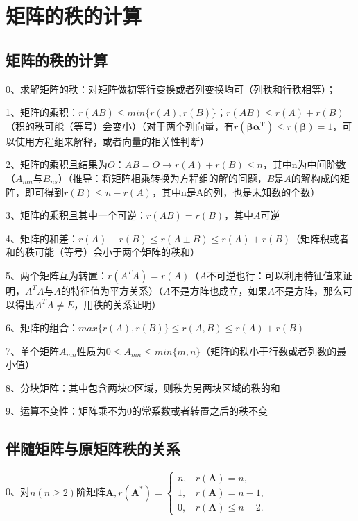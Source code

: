 \section{矩阵的秩的计算}



\subsection{矩阵的秩的计算}

0、求解矩阵的秩：对矩阵做初等行变换或者列变换均可（列秩和行秩相等）；

1、矩阵的乘积：$r(AB) \leqslant min\{r(A),r(B)\}$；$r(AB) \leqslant r(A)+r(B)$（积的秩可能（等号）会变小）（对于两个列向量，有$r\left(\boldsymbol{\beta} \boldsymbol{\alpha}^{\mathrm{T}}\right) \leqslant r(\boldsymbol{\beta})=1$，可以使用方程组来解释，或者向量的相关性判断）

2、矩阵的乘积且结果为$O$：$AB=O \rightarrow r(A)+r(B) \leqslant n$，其中n为中间阶数（$A_{mn}$与$B_{ns}$）（推导：将矩阵相乘转换为方程组的解的问题，$B$是$A$的解构成的矩阵，即可得到$r(B)\leqslant n - r(A) $，其中n是A的列，也是未知数的个数）

3、矩阵的乘积且其中一个可逆：$r(AB)=r(B)$，其中$A$可逆

4、矩阵的和差：$r(A)-r(B)\leqslant r(A\pm B) \leqslant r(A)+r(B)$（矩阵积或者和的秩可能（等号）会小于两个矩阵的秩和）

5、两个矩阵互为转置：$r(A^TA)= r(A)$（$A$不可逆也行：可以利用特征值来证明，$A^TA$与$A$的特征值为平方关系）（$A$不是方阵也成立，如果$A$不是方阵，那么可以得出$A^TA \ne E$，用秩的关系证明）

6、矩阵的组合：$max\{r(A),r(B)\}  \leqslant r(A,B) \leqslant r(A)+r(B)$

7、单个矩阵$A_{mn}$性质为$0 \leqslant A_{mn} \leqslant min\{ m,n \}$（矩阵的秩小于行数或者列数的最小值）

8、分块矩阵：其中包含两块$O$区域，则秩为另两块区域的秩的和

9、运算不变性：矩阵乘不为0的常系数或者转置之后的秩不变



\subsection{伴随矩阵与原矩阵秩的关系}

0、对$n(n \geqslant 2)$阶矩阵$\boldsymbol{A}, r\left(\boldsymbol{A}^{*}\right)= \begin{cases}n, & r(\boldsymbol{A})=n, \\ 1, & r(\boldsymbol{A})=n-1, \\ 0, & r(\boldsymbol{A}) \leqslant n-2 .\end{cases}$

